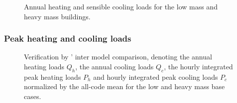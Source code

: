 \begin{figure}[ht]
\caption{Annual heating and sensible cooling loads for the low mass and heavy mass buildings.} 
\end{figure}

\subsubsection{Peak heating and cooling loads}

\begin{figure}[t]
 \center
 
 \caption{Verification by ' inter model comparison, denoting the annual heating loads $Q_{h}$, the annual cooling loads $Q_{c}$, the hourly integrated peak heating loads $P_{h}$ and hourly integrated peak cooling loads $P_{c}$ normalized by the all-code mean for the low and heavy mass base cases.}
\end{figure}


